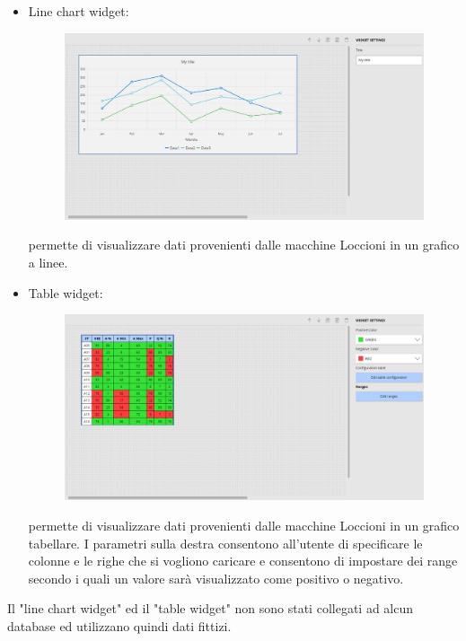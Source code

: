 \begin{itemize}
    \item Line chart widget: 
    
\begin{figure}[ht]
\centering
\includegraphics[scale=0.32]{Images/Linechart.JPG}
\end{figure}
permette di visualizzare dati provenienti dalle macchine Loccioni in un grafico a linee.
\end{itemize}

\pagebreak
\begin{itemize}
    \item Table widget: 
    
\begin{figure}[ht]
\centering
\includegraphics[scale=0.35]{Images/Table.png}
\end{figure}
permette di visualizzare dati provenienti dalle macchine Loccioni in un grafico tabellare. I parametri sulla destra consentono all'utente di specificare le colonne e le righe che si vogliono caricare e consentono di impostare dei range secondo i quali un valore sarà visualizzato come positivo o negativo.
\end{itemize}
Il "line chart widget" ed il "table widget" non sono stati collegati ad alcun database ed utilizzano quindi dati fittizi.